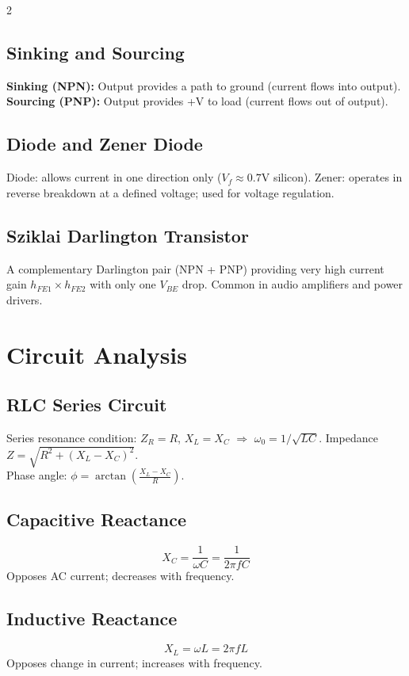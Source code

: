 \documentclass[10pt,a4paper]{article}
\begin{document}
\begin{multicols}{2}
\subsection{Sinking and Sourcing}
\textbf{Sinking (NPN):} Output provides a path to ground (current flows into output).\\
\textbf{Sourcing (PNP):} Output provides +V to load (current flows out of output).

\subsection{Diode and Zener Diode}
Diode: allows current in one direction only ($V_f \approx 0.7$V silicon). Zener: operates in reverse breakdown at a defined voltage; used for voltage regulation.

\subsection{Sziklai Darlington Transistor}
A complementary Darlington pair (NPN + PNP) providing very high current gain $h_{FE1} \times h_{FE2}$ with only one $V_{BE}$ drop. Common in audio amplifiers and power drivers.

\section{Circuit Analysis}

\subsection{RLC Series Circuit}
Series resonance condition: $Z_R = R$, $X_L = X_C$ $\Rightarrow$ $\omega_0 = 1/\sqrt{LC}$. Impedance $Z = \sqrt{R^2 + (X_L - X_C)^2}$.\\
Phase angle: $\phi = \arctan\!\left(\frac{X_L - X_C}{R}\right)$.

\subsection{Capacitive Reactance}
\[
X_C = \frac{1}{\omega C} = \frac{1}{2\pi f C}
\]
Opposes AC current; decreases with frequency.

\subsection{Inductive Reactance}
\[
X_L = \omega L = 2\pi f L
\]
Opposes change in current; increases with frequency.


\end{multicols}
\end{document}
